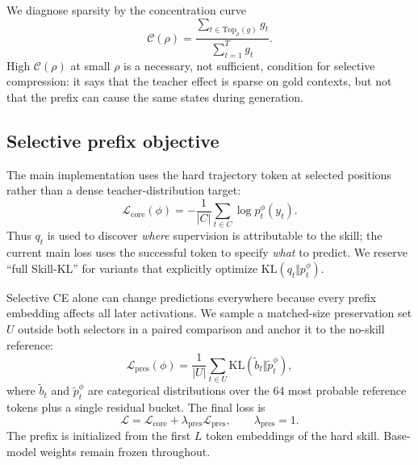We diagnose sparsity by the concentration curve
\begin{equation}
\mathcal{C}(\rho)=\frac{\sum_{t\in\mathrm{Top}_\rho(g)}g_t}{\sum_{t=1}^T g_t}.
\end{equation}
High $\mathcal{C}(\rho)$ at small $\rho$ is a necessary, not sufficient, condition for selective compression: it says that the teacher effect is sparse on gold contexts, but not that the prefix can cause the same states during generation.

\subsection{Selective prefix objective}
The main implementation uses the hard trajectory token at selected positions rather than a dense teacher-distribution target:
\begin{equation}
\mathcal{L}_{\mathrm{core}}(\phi)=-\frac{1}{|C|}\sum_{t\in C}\log p^\phi_t(y_t).
\label{eq:core}
\end{equation}
Thus $q_t$ is used to discover \emph{where} supervision is attributable to the skill; the current main loss uses the successful token to specify \emph{what} to predict.  We reserve ``full Skill-KL'' for variants that explicitly optimize $\mathrm{KL}(q_t\Vert p_t^\phi)$.

Selective CE alone can change predictions everywhere because every prefix embedding affects all later activations.  We sample a matched-size preservation set $U$ outside both selectors in a paired comparison and anchor it to the no-skill reference:
\begin{equation}
\mathcal{L}_{\mathrm{pres}}(\phi)=\frac{1}{|U|}\sum_{t\in U}\mathrm{KL}\!\left(\tilde b_t\Vert\tilde p^\phi_t\right),
\label{eq:preserve}
\end{equation}
where $\tilde b_t$ and $\tilde p^\phi_t$ are categorical distributions over the 64 most probable reference tokens plus a single residual bucket.  The final loss is
\begin{equation}
\mathcal{L}=\mathcal{L}_{\mathrm{core}}+\lambda_{\mathrm{pres}}\mathcal{L}_{\mathrm{pres}},
\qquad \lambda_{\mathrm{pres}}=1.
\label{eq:loss}
\end{equation}
The prefix is initialized from the first $L$ token embeddings of the hard skill.  Base-model weights remain frozen throughout.

